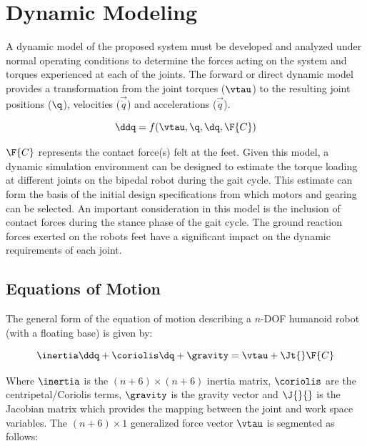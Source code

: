 
\section{Dynamic Modeling} %
\label{sec:designspec}

A dynamic model of the proposed system must be developed and analyzed under normal operating conditions to determine the forces acting on the system and torques experienced at each of the joints. The forward or direct dynamic model provides a transformation from the joint torques ($\vtau$) to the resulting joint positions ($\q$), velocities ($\vec{\dot{q}}$) and accelerations ($\vec{\ddot{q}}$).

\begin{equation}
	\ddq = f(\vtau, \q, \dq, \F{C})
\end{equation}

$\F{C}$ represents the contact force(s) felt at the feet. Given this model, a dynamic simulation environment can be designed to estimate the torque loading at different joints on the bipedal robot during the gait cycle. This estimate can form the basis of the initial design specifications from which motors and gearing can be selected. An important consideration in this model is the inclusion of contact forces during the stance phase of the gait cycle. The ground reaction forces exerted on the robots feet have a significant impact on the dynamic requirements of each joint.

\subsection{Equations of Motion} %
\label{sec:forward_dynamics}

The general form of the equation of motion describing a $n$-DOF humanoid robot (with a floating base) is given by: 

\begin{equation}
	\label{eq:eom1}
	\inertia \ddq + \coriolis \dq + \gravity = \vtau + \Jt{} \F{C}
\end{equation}

Where $\inertia$ is the $(n+6) \times (n+6)$ inertia matrix, $\coriolis$ are the centripetal/Coriolis terms, $\gravity$ is the gravity vector and $\J{}{}$ is the Jacobian matrix which provides the mapping between the joint and work space variables. The $(n+6) \times 1$ generalized force vector $\vtau$ is segmented as follows:

